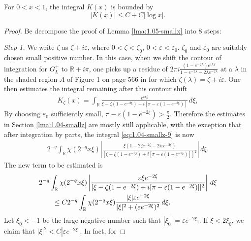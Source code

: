 \documentclass[GreensFunctions.tex]{subfiles}
\begin{document}
\begin{lma}\label{lma:1.05-smallx}
	For $0<x <1$, the integral $K(x)$ is bounded by
	\[
		|K(x)| \leq C + C |\log x|.
	\]
\end{lma}
\begin{proof}
	Be decompose the proof of Lemma \ref{lma:1.05-smallx} into 8 steps:

	{\em Step 1.} 
	We write $\zeta$ as $\zeta+i\varepsilon$, where $0<\zeta<\zeta_0$, 
	$0<\varepsilon<\varepsilon_0$. $\zeta_0$ and $\varepsilon_0$ are suitably chosen 
	small positive number. In this case, when we 
	shift the contour of integration for $G_L^+$ to $\mathbb R + i\pi$, one picks 
	up a residue of 
	$2\pi i \frac{(1-e^{-2\lambda})e^{i\lambda x }}{1-e^{-2\lambda} -2\lambda e^{-2\lambda}}$ 
	at a $\lambda$ in the shaded region $A$ of Figure 1 on page 566 in \cite{Kodama1982} for 
	which $\zeta(\lambda) = \zeta+i\varepsilon$. One then estimates the integral remaining
	after this contour shift
	\begin{align*}
		K_{\zeta}(x) 
			= 
				\int_{\mathbb R} 
					\frac{e^{ix\xi}}{\xi-\zeta(1-e^{-2\xi})+i[\pi-\varepsilon(1-e^{-2\xi})]}
				\,d\xi,	
	\end{align*}
	By choosing $\varepsilon_0$ sufficiently small, $\pi-\varepsilon(1-e^{-2\xi})>\frac\pi 2$. 
	Therefore the estimates in Section \ref{lma:1.04-smallz} are mostly still applicable, 
	with the exception that after integration by parts, the integral 
	\eqref{eq:1.04-smallz-9} is now
	\begin{align*}
		2^{-q} 
		\int_{\mathbb R} 
			\chi(2^{-q}x\xi)
			\left|
				\frac{\xi(1-2\zeta e^{-2\xi}-2i\varepsilon e^{-2\xi})}
					{[\xi-\zeta(1-e^{-2\xi})+i[\pi-\varepsilon(1-e^{-2\xi})]]^2}
			\right|
		\,d\xi.	
	\end{align*}
	The new term to be estimated is 
	\begin{align}
		&2^{-q} 
			\int_{\mathbb R} 
				\chi(2^{-q}x\xi)
				\left|
					\frac{\varepsilon \xi e^{-2\xi}}
						{[\xi-\zeta(1-e^{-2\xi})+i[\pi-\varepsilon(1-e^{-2\xi})]]^2}
				\right|
			\,d\xi 
			\notag\\
		&\qquad \le 
			C2^{-q} 
			\int_{\mathbb R} 
				\chi(2^{-q}x\xi)
				\frac{| \xi |\varepsilon e^{-2\xi}}
					{|\xi|^2+(\varepsilon e^{-2\xi})^2}
			\,d\xi.
			\label{eq: step 1 new term}
	\end{align}
	Let $\xi_0<-1$ be the large negative number such that $|\xi_0|= \varepsilon e^{-2\xi_0}$. 
	If $\xi<2\xi_0$, we claim that $|\xi|^2<C|\varepsilon e^{-2\xi}|$. In fact, for 

\end{proof}
\end{document}
